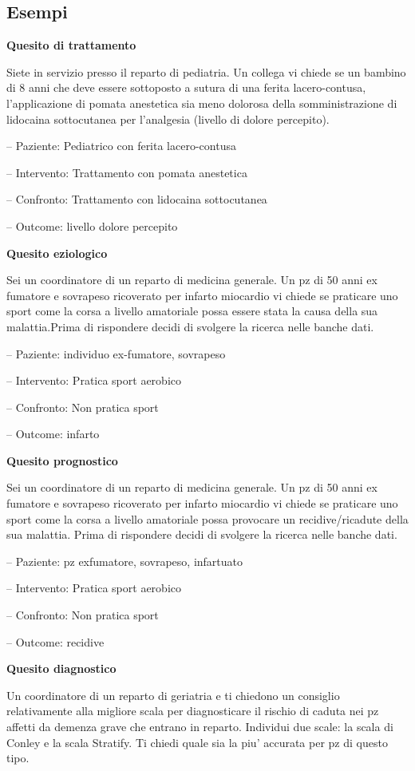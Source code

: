 \documentclass[]{book}
\begin{document}
\hypertarget{esempi}{%
\subsection{Esempi}\label{esempi}}

\textbf{Quesito di trattamento}

Siete in servizio presso il reparto di pediatria. Un collega vi chiede se un bambino di 8 anni che deve essere sottoposto a sutura di una ferita lacero-contusa, l'applicazione di pomata anestetica sia meno dolorosa della somministrazione di lidocaina sottocutanea per l'analgesia (livello di dolore percepito).

-- Paziente: Pediatrico con ferita lacero-contusa

-- Intervento: Trattamento con pomata anestetica

-- Confronto: Trattamento con lidocaina sottocutanea

-- Outcome: livello dolore percepito

\textbf{Quesito eziologico}

Sei un coordinatore di un reparto di medicina generale. Un pz di 50 anni ex fumatore e sovrapeso ricoverato per infarto miocardio vi chiede se praticare uno sport come la corsa a livello amatoriale possa essere stata la causa della sua malattia.Prima di rispondere decidi di svolgere la ricerca nelle banche dati.

-- Paziente: individuo ex-fumatore, sovrapeso

-- Intervento: Pratica sport aerobico

-- Confronto: Non pratica sport

-- Outcome: infarto

\textbf{Quesito prognostico}

Sei un coordinatore di un reparto di medicina generale. Un pz di 50 anni ex fumatore e sovrapeso ricoverato per infarto miocardio vi chiede se praticare uno sport come la corsa a livello amatoriale possa provocare un recidive/ricadute della sua malattia. Prima di rispondere decidi di svolgere la ricerca nelle banche dati.

-- Paziente: pz exfumatore, sovrapeso, infartuato

-- Intervento: Pratica sport aerobico

-- Confronto: Non pratica sport

-- Outcome: recidive

\textbf{Quesito diagnostico}

Un coordinatore di un reparto di geriatria e ti chiedono un consiglio relativamente alla migliore scala per diagnosticare il rischio di caduta nei pz affetti da demenza grave che entrano in reparto. Individui due scale: la scala di Conley e la scala Stratify. Ti chiedi quale sia la piu' accurata per pz di questo tipo.
\end{document}
